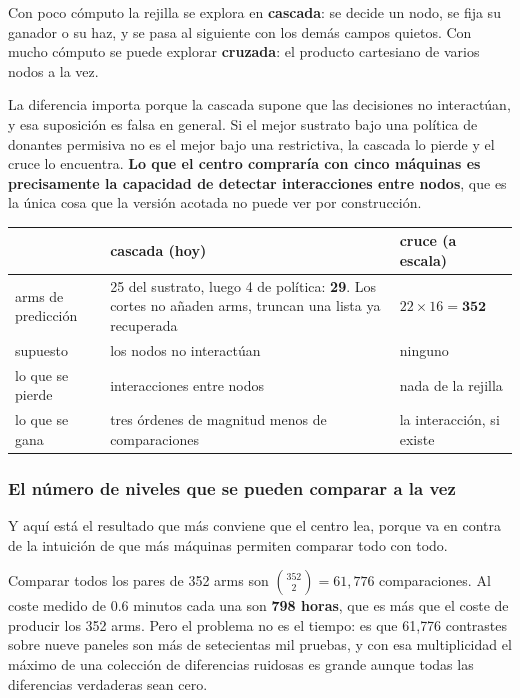 Con poco cómputo la rejilla se explora en \textbf{cascada}: se decide un nodo, se
fija su ganador o su haz, y se pasa al siguiente con los demás campos quietos. Con
mucho cómputo se puede explorar \textbf{cruzada}: el producto cartesiano de varios
nodos a la vez.

La diferencia importa porque la cascada supone que las decisiones no interactúan, y
esa suposición es falsa en general. Si el mejor sustrato bajo una política de
donantes permisiva no es el mejor bajo una restrictiva, la cascada lo pierde y el
cruce lo encuentra. \textbf{Lo que el centro compraría con cinco máquinas es
precisamente la capacidad de detectar interacciones entre nodos}, que es la única
cosa que la versión acotada no puede ver por construcción.

\begin{center}
\begin{tabularx}{\linewidth}{@{}L{3.4cm} X X@{}}
\toprule
 & cascada (hoy) & cruce (a escala)\\
\midrule
arms de predicción & 25 del sustrato, luego 4 de política: \textbf{29}. Los cortes no añaden arms, truncan una lista ya recuperada & $22 \times 16 = \mathbf{352}$\\
supuesto           & los nodos no interactúan & ninguno\\
lo que se pierde   & interacciones entre nodos & nada de la rejilla\\
lo que se gana     & tres órdenes de magnitud menos de comparaciones & la interacción, si existe\\
\bottomrule
\end{tabularx}
\end{center}

\subsubsection*{El número de niveles que se pueden comparar a la vez}

Y aquí está el resultado que más conviene que el centro lea, porque va en contra de
la intuición de que más máquinas permiten comparar todo con todo.

Comparar todos los pares de 352 arms son $\binom{352}{2} = 61{,}776$ comparaciones.
Al coste medido de 0.6 minutos cada una son \textbf{798 horas}, que es más que el
coste de producir los 352 arms. Pero el problema no es el tiempo: es que 61{,}776
contrastes sobre nueve paneles son más de setecientas mil pruebas, y con esa
multiplicidad el máximo de una colección de diferencias ruidosas es grande aunque
todas las diferencias verdaderas sean cero.

